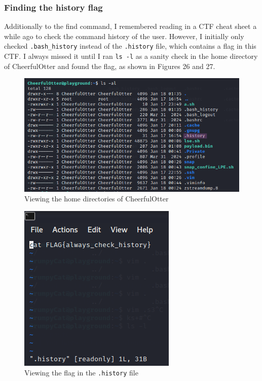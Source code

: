 \documentclass[a4paper]{article}
\newcommand{\abc}{\hfill \break}
\begin{document}
\subsubsection{Finding the history flag}
Additionally to the find command, I remembered reading in a CTF cheat sheet a while ago to check the command history of the user. However, I initially only checked \texttt{.bash\_history} instead of the \texttt{.history} file, which contains a flag in this CTF. I always missed it until I ran \texttt{ls -l} as a sanity check in the home directory of CheerfulOtter and found the flag, as shown in Figures 26 and 27.\cite{enumeration-walkthough}
\begin{figure}[ht]
	\includegraphics[scale=0.5]{images/colsal.png}
	\centering
	\caption{Viewing the home directories of CheerfulOtter}
\end{figure}
\begin{figure}[h]
	\includegraphics[scale=0.7]{images/cofl.png}
	\centering
	\caption{Viewing the flag in the \texttt{.history} file}
\end{figure}\abc
\newpage
\end{document}
